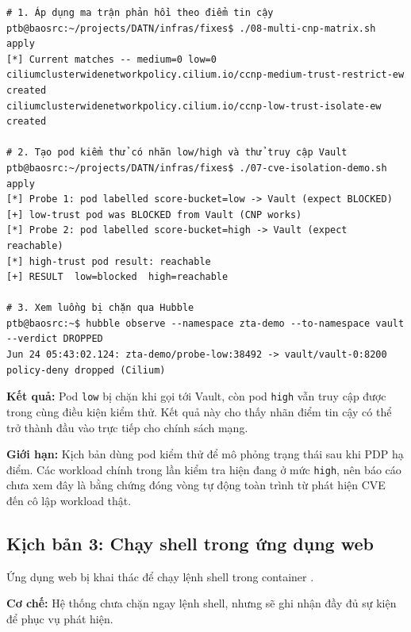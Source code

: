 \begin{listing}[H]
\begin{verbatim}
# 1. Áp dụng ma trận phản hồi theo điểm tin cậy
ptb@baosrc:~/projects/DATN/infras/fixes$ ./08-multi-cnp-matrix.sh apply
[*] Current matches -- medium=0 low=0
ciliumclusterwidenetworkpolicy.cilium.io/ccnp-medium-trust-restrict-ew created
ciliumclusterwidenetworkpolicy.cilium.io/ccnp-low-trust-isolate-ew created

# 2. Tạo pod kiểm thử có nhãn low/high và thử truy cập Vault
ptb@baosrc:~/projects/DATN/infras/fixes$ ./07-cve-isolation-demo.sh apply
[*] Probe 1: pod labelled score-bucket=low -> Vault (expect BLOCKED)
[+] low-trust pod was BLOCKED from Vault (CNP works)
[*] Probe 2: pod labelled score-bucket=high -> Vault (expect reachable)
[*] high-trust pod result: reachable
[+] RESULT  low=blocked  high=reachable

# 3. Xem luồng bị chặn qua Hubble
ptb@baosrc:~$ hubble observe --namespace zta-demo --to-namespace vault --verdict DROPPED
Jun 24 05:43:02.124: zta-demo/probe-low:38492 -> vault/vault-0:8200 policy-deny dropped (Cilium)
\end{verbatim}
\caption{Kiểm thử cô lập workload theo nhãn tin cậy}
\label{lst:c3_kb2}
\end{listing}

\textbf{Kết quả:} Pod \texttt{low} bị chặn khi gọi tới Vault, còn pod \texttt{high} vẫn truy cập được trong cùng điều kiện kiểm thử. Kết quả này cho thấy nhãn điểm tin cậy có thể trở thành đầu vào trực tiếp cho chính sách mạng.

\textbf{Giới hạn:} Kịch bản dùng pod kiểm thử để mô phỏng trạng thái sau khi PDP hạ điểm. Các workload chính trong lần kiểm tra hiện đang ở mức \texttt{high}, nên báo cáo chưa xem đây là bằng chứng đóng vòng tự động toàn trình từ phát hiện CVE đến cô lập workload thật.

\subsection{Kịch bản 3: Chạy shell trong ứng dụng web}
\label{subsec:c3_kb3}

Ứng dụng web bị khai thác để chạy lệnh shell trong container \parencite{mitre_t1190}.

\textbf{Cơ chế:} Hệ thống chưa chặn ngay lệnh shell, nhưng sẽ ghi nhận đầy đủ sự kiện để phục vụ phát hiện.

